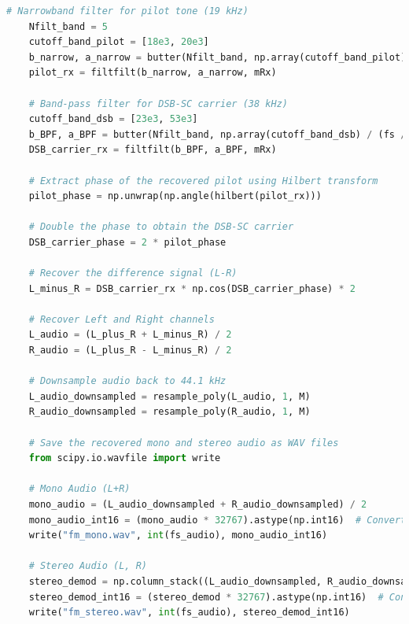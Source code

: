 \documentclass[
	letterpaper, %
	10pt, %
]{CSUniSchoolLabReport}
\begin{document}
\begin{lstlisting}[language=Python]
	# Narrowband filter for pilot tone (19 kHz)
	Nfilt_band = 5
	cutoff_band_pilot = [18e3, 20e3]
	b_narrow, a_narrow = butter(Nfilt_band, np.array(cutoff_band_pilot) / (fs / 2), btype='band')
	pilot_rx = filtfilt(b_narrow, a_narrow, mRx)
	
	# Band-pass filter for DSB-SC carrier (38 kHz)
	cutoff_band_dsb = [23e3, 53e3]
	b_BPF, a_BPF = butter(Nfilt_band, np.array(cutoff_band_dsb) / (fs / 2), btype='band')
	DSB_carrier_rx = filtfilt(b_BPF, a_BPF, mRx)
	
	# Extract phase of the recovered pilot using Hilbert transform
	pilot_phase = np.unwrap(np.angle(hilbert(pilot_rx)))
	
	# Double the phase to obtain the DSB-SC carrier
	DSB_carrier_phase = 2 * pilot_phase
	
	# Recover the difference signal (L-R)
	L_minus_R = DSB_carrier_rx * np.cos(DSB_carrier_phase) * 2
	
	# Recover Left and Right channels
	L_audio = (L_plus_R + L_minus_R) / 2
	R_audio = (L_plus_R - L_minus_R) / 2
	
	# Downsample audio back to 44.1 kHz
	L_audio_downsampled = resample_poly(L_audio, 1, M)
	R_audio_downsampled = resample_poly(R_audio, 1, M)
	
	# Save the recovered mono and stereo audio as WAV files
	from scipy.io.wavfile import write
	
	# Mono Audio (L+R)
	mono_audio = (L_audio_downsampled + R_audio_downsampled) / 2
	mono_audio_int16 = (mono_audio * 32767).astype(np.int16)  # Convert to 16-bit PCM
	write("fm_mono.wav", int(fs_audio), mono_audio_int16)
	
	# Stereo Audio (L, R)
	stereo_demod = np.column_stack((L_audio_downsampled, R_audio_downsampled))
	stereo_demod_int16 = (stereo_demod * 32767).astype(np.int16)  # Convert to 16-bit PCM
	write("fm_stereo.wav", int(fs_audio), stereo_demod_int16)
	
\end{lstlisting}
\end{document}
